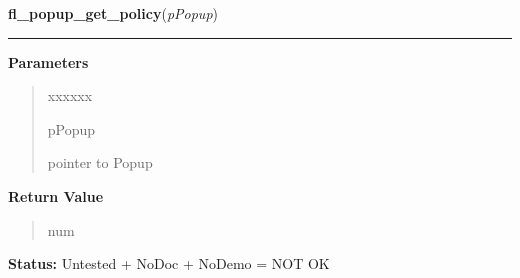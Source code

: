 \hspace{.8\funcindent}\begin{boxedminipage}{\funcwidth}

    \raggedright \textbf{fl\_popup\_get\_policy}(\textit{pPopup})

    \vspace{-1.5ex}

    \rule{\textwidth}{0.5\fboxrule}
\setlength{\parskip}{2ex}
\setlength{\parskip}{1ex}
      \textbf{Parameters}
      \vspace{-1ex}

      \begin{quote}
        \begin{Ventry}{xxxxxx}

          \item[pPopup]

          pointer to Popup

        \end{Ventry}

      \end{quote}

      \textbf{Return Value}
    \vspace{-1ex}

      \begin{quote}
      num

      \end{quote}

\textbf{Status:} Untested + NoDoc + NoDemo = NOT OK



    \end{boxedminipage}

    \label{xformslib:flpopup:fl_popup_set_policy}

    \vspace{0.5ex}


